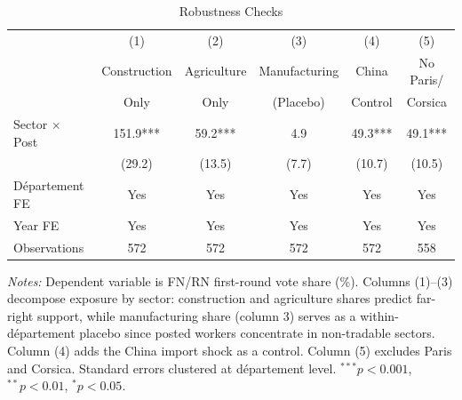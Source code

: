 \begin{table}[htbp]
\centering
\caption{Robustness Checks}
\label{tab:robust}
\begin{tabular}{lccccc}
\toprule
 & (1) & (2) & (3) & (4) & (5) \\
 & Construction & Agriculture & Manufacturing & China & No Paris/ \\
 & Only & Only & (Placebo) & Control & Corsica \\
\midrule
Sector $\times$ Post & 151.9*** & 59.2*** & 4.9 & 49.3*** & 49.1*** \\
 & (29.2) & (13.5) & (7.7) & (10.7) & (10.5) \\
\midrule
D\'epartement FE & Yes & Yes & Yes & Yes & Yes \\
Year FE & Yes & Yes & Yes & Yes & Yes \\
Observations & 572 & 572 & 572 & 572 & 558 \\
\bottomrule
\end{tabular}
\begin{tablenotes}[flushleft]\small
\item \textit{Notes:} Dependent variable is FN/RN first-round vote share (\%). Columns (1)--(3) decompose exposure by sector: construction and agriculture shares predict far-right support, while manufacturing share (column 3) serves as a within-d\'epartement placebo since posted workers concentrate in non-tradable sectors. Column (4) adds the China import shock as a control. Column (5) excludes Paris and Corsica. Standard errors clustered at d\'epartement level. $^{***}p<0.001$, $^{**}p<0.01$, $^{*}p<0.05$.
\end{tablenotes}
\end{table}
